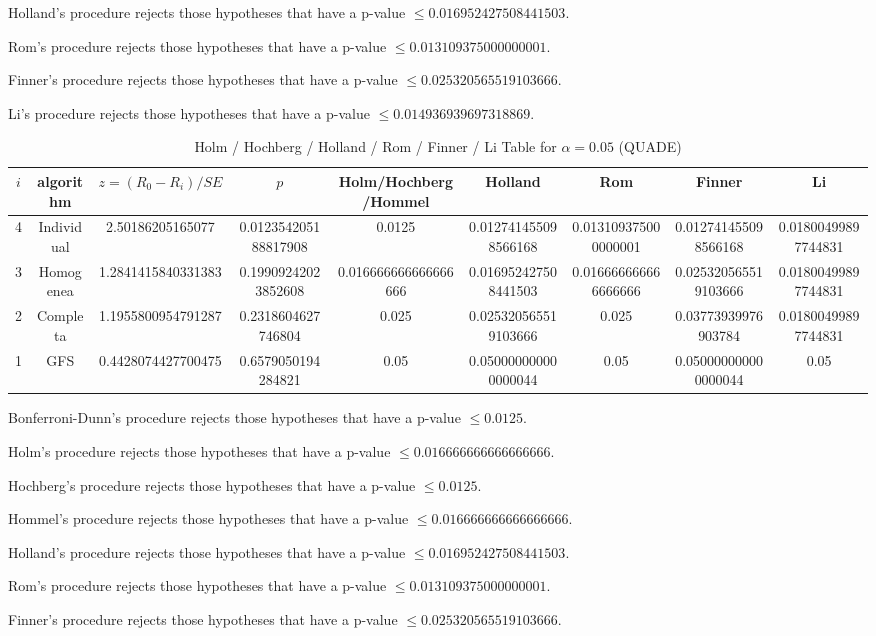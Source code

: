 \documentclass[a4paper,10pt]{article}
\begin{document}
\begin{landscape}
Holland's procedure rejects those hypotheses that have a p-value $\le0.016952427508441503$.


Rom's procedure rejects those hypotheses that have a p-value $\le0.013109375000000001$.


Finner's procedure rejects those hypotheses that have a p-value $\le0.025320565519103666$.


Li's procedure rejects those hypotheses that have a p-value $\le0.014936939697318869$.



\newpage

\begin{table}[!htp]
\centering\scriptsize
\caption{Holm / Hochberg / Holland / Rom / Finner / Li Table for $\alpha=0.05$ (QUADE)}
\begin{tabular}{ccccccccc}
$i$&algorithm&$z=(R_0 - R_i)/SE$&$p$&Holm/Hochberg/Hommel&Holland&Rom&Finner&Li\\
\hline
4&Individual&2.50186205165077&0.012354205188817908&0.0125&0.012741455098566168&0.013109375000000001&0.012741455098566168&0.01800499897744831\\
3&Homogenea&1.2841415840331383&0.19909242023852608&0.016666666666666666&0.016952427508441503&0.016666666666666666&0.025320565519103666&0.01800499897744831\\
2&Completa&1.1955800954791287&0.2318604627746804&0.025&0.025320565519103666&0.025&0.03773939976903784&0.01800499897744831\\
1&GFS&0.4428074427700475&0.6579050194284821&0.05&0.050000000000000044&0.05&0.050000000000000044&0.05\\
\hline
\end{tabular}
\end{table}
Bonferroni-Dunn's procedure rejects those hypotheses that have a p-value $\le0.0125$.


Holm's procedure rejects those hypotheses that have a p-value $\le0.016666666666666666$.


Hochberg's procedure rejects those hypotheses that have a p-value $\le0.0125$.


Hommel's procedure rejects those hypotheses that have a p-value $\le0.016666666666666666$.


Holland's procedure rejects those hypotheses that have a p-value $\le0.016952427508441503$.


Rom's procedure rejects those hypotheses that have a p-value $\le0.013109375000000001$.


Finner's procedure rejects those hypotheses that have a p-value $\le0.025320565519103666$.



\end{landscape}
\end{document}
